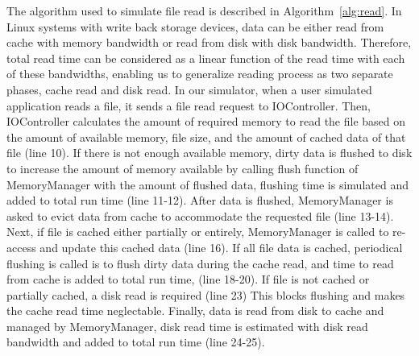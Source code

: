 \documentclass[conference]{IEEEtran}
\begin{document}
			The algorithm used to simulate file read is described in 
			Algorithm~\ref{alg:read}. 
			In Linux systems with write back storage devices, data can be either read 
			from cache with memory bandwidth or read from disk with disk bandwidth. 
			Therefore, total read time can be considered as a linear function 
			of the read time with each of these bandwidths, 
			enabling us to generalize reading process as two separate phases, 
			cache read and disk read. 
			In our simulator, when a user simulated application reads a file, 
			it sends a file read request to IOController. 
			Then, IOController calculates the amount of required memory to read 
			the file based on the amount of available memory, file size, and 
			the amount of cached data of that file (line 10). 
			If there is not enough available memory, dirty data is flushed to disk 
			to increase the amount of memory available by calling flush function 
			of MemoryManager with the amount of flushed data, flushing time is 
			simulated and added to total run time (line 11-12).
			After data is flushed, MemoryManager is asked to evict data 
			from cache to accommodate the requested file (line 13-14). 
			Next, if file is cached either partially or entirely, MemoryManager is 
			called to re-access and update this cached data (line 16). 
			If all file data is cached, periodical flushing is called is to flush 
			dirty data during the cache read, and time to read from cache is added to 
			total run time, (line 18-20). 
			If file is not cached or partially cached, a disk read is required (line 23) 
			This blocks flushing and makes the cache read time neglectable. 
			Finally, data is read from disk to cache and managed 
			by MemoryManager, disk read time is estimated with disk read 
			bandwidth and added to total run time (line 24-25). 
\end{document}
